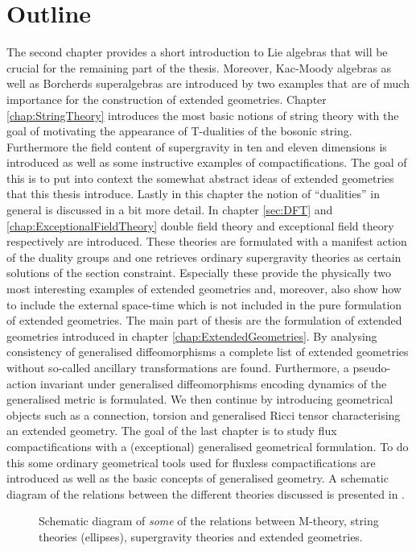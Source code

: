 \section{Outline}
The second chapter provides a short introduction to Lie algebras that will be crucial for the remaining part of the thesis. Moreover, Kac-Moody algebras as well as Borcherds superalgebras are introduced by two examples that are of much importance for the construction of extended geometries. Chapter \ref{chap:StringTheory} introduces the most basic notions of string theory with the goal of motivating the appearance of T-dualities of the bosonic string. Furthermore the field content of supergravity in ten and eleven dimensions is introduced as well as some instructive examples of compactifications. The goal of this is to put into context the somewhat abstract ideas of extended geometries that this thesis introduce. Lastly in this chapter the notion of ``dualities'' in general is discussed in a bit more detail. In chapter \ref{sec:DFT} and \ref{chap:ExceptionalFieldTheory} double field theory and exceptional field theory respectively are introduced. These theories are formulated with a manifest action of the duality groups and one retrieves ordinary supergravity theories as certain solutions of the section constraint. Especially these provide the physically two most interesting examples of extended geometries and, moreover, also show how to include the external space-time which is not included in the pure formulation of extended geometries. The main part of thesis are the formulation of extended geometries introduced in chapter \ref{chap:ExtendedGeometries}. By analysing consistency of generalised diffeomorphisms a complete list of extended geometries without so-called ancillary transformations are found. Furthermore, a pseudo-action invariant under generalised diffeomorphisms encoding dynamics of the generalised metric is formulated. We then continue by introducing geometrical objects such as a connection, torsion and generalised Ricci tensor characterising an extended geometry. The goal of the last chapter is to study flux compactifications with a (exceptional) generalised geometrical formulation. To do this some ordinary geometrical tools used for fluxless compactifications are introduced as well as the basic concepts of generalised geometry. A schematic diagram of the relations between the different theories discussed is presented in . 


\begin{figure}
    \caption{Schematic diagram of \emph{some} of the relations between M-theory, string theories (ellipses), supergravity theories and extended geometries.}
    \label{fig:TheGodFather}
\end{figure}


